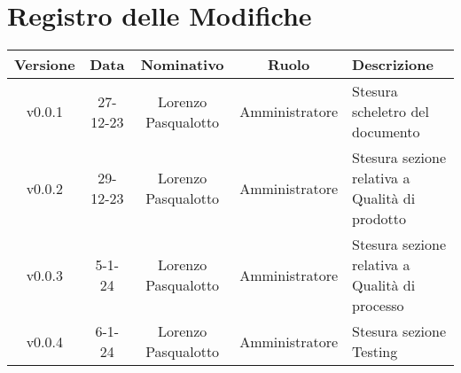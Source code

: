 \section*{\Large Registro delle Modifiche}
    \begin{table}[h]
        \centering
        \renewcommand\tabularxcolumn[1]{m{#1}} %
        \renewcommand{\arraystretch}{1.5}
        \begin{tabularx}{0.98\textwidth}
            {c|c|c|c|>{\centering\arraybackslash}X}
            \rowcolor{black}
            \textbf{\color{white} Versione} & \textbf{\color{white} Data} & \textbf{\color{white} Nominativo} & \textbf{\color{white} Ruolo} & \textbf{\color{white} Descrizione} \\ 
            \hline

            v0.0.1 & 27-12-23 & Lorenzo Pasqualotto & Amministratore & Stesura scheletro del documento \\

            v0.0.2 & 29-12-23 & Lorenzo Pasqualotto & Amministratore & Stesura sezione relativa a Qualità di prodotto\\

            v0.0.3 & 5-1-24 & Lorenzo Pasqualotto & Amministratore & Stesura sezione relativa a Qualità di processo\\

            v0.0.4 & 6-1-24 & Lorenzo Pasqualotto & Amministratore & Stesura sezione Testing\\

            \hline
        \end{tabularx}
    \end{table}